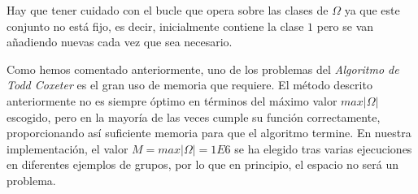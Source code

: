 Hay que tener cuidado con el bucle que opera sobre las clases de $\Omega$ ya que este conjunto no está fijo, es decir,  inicialmente contiene la clase $1$ pero se van añadiendo nuevas cada vez que sea necesario. 

Como hemos comentado anteriormente, uno de los problemas del \textit{Algoritmo de Todd Coxeter} es el gran uso de memoria que requiere. El método descrito anteriormente no es siempre óptimo en términos del máximo valor $max{|\Omega|}$ escogido, pero en la mayoría de las veces cumple su función correctamente, proporcionando así suficiente memoria para que el algoritmo termine.
 En nuestra implementación, el valor $M=max|\Omega| = 1E6$ se ha elegido tras varias ejecuciones en diferentes ejemplos de grupos, por lo que en principio, el espacio no será un problema.



